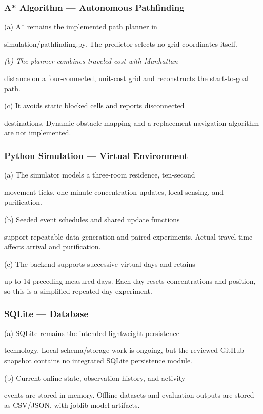 \documentclass[conference]{IEEEtran}
\begin{document}
\subsubsection{A* Algorithm --- Autonomous Pathfinding \cite{ref12}}

(a) A* remains the implemented path planner in

simulation/pathfinding.py. The predictor selects no grid coordinates itself.

\emph{(b) The planner combines traveled cost with Manhattan}

distance on a four-connected, unit-cost grid and reconstructs the start-to-goal path.

(c) It avoids static blocked cells and reports disconnected

destinations. Dynamic obstacle mapping and a replacement navigation algorithm are not implemented.

\subsubsection{Python Simulation --- Virtual Environment \cite{ref5}}

(a) The simulator models a three-room residence, ten-second

movement ticks, one-minute concentration updates, local sensing, and purification.

(b) Seeded event schedules and shared update functions

support repeatable data generation and paired experiments. Actual travel time affects arrival and purification.

(c) The backend supports successive virtual days and retains

up to 14 preceding measured days. Each day resets concentrations and position, so this is a simplified repeated-day experiment.

\subsubsection{SQLite --- Database \cite{ref10}}

(a) SQLite remains the intended lightweight persistence

technology. Local schema/storage work is ongoing, but the reviewed GitHub snapshot contains no integrated SQLite persistence module.

(b) Current online state, observation history, and activity

events are stored in memory. Offline datasets and evaluation outputs are stored as CSV/JSON, with joblib model artifacts.
\end{document}
